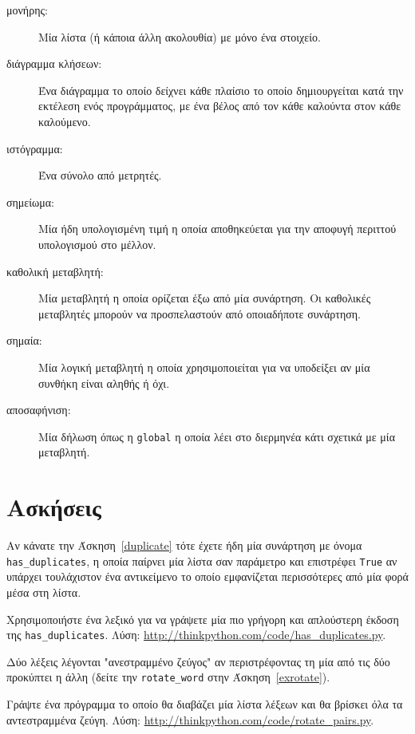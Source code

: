 \documentclass[10pt]{book}
\begin{document}
\begin{description}
\item[μονήρης:] Μία λίστα (ή κάποια άλλη ακολουθία) με μόνο ένα στοιχείο.

\item[διάγραμμα κλήσεων:] Ένα διάγραμμα το οποίο δείχνει κάθε πλαίσιο το οποίο δημιουργείται κατά την εκτέλεση ενός προγράμματος, με ένα βέλος από τον κάθε καλούντα στον κάθε καλούμενο.

\item[ιστόγραμμα:] Ένα σύνολο από μετρητές.

\item[σημείωμα:] Μία ήδη υπολογισμένη τιμή η οποία αποθηκεύεται για την αποφυγή περιττού υπολογισμού στο μέλλον.

\item[καθολική μεταβλητή:] Μία μεταβλητή η οποία ορίζεται έξω από μία συνάρτηση. Οι καθολικές μεταβλητές μπορούν να προσπελαστούν από οποιαδήποτε συνάρτηση.

\item[σημαία:] Μία λογική μεταβλητή η οποία χρησιμοποιείται για να υποδείξει αν μία συνθήκη είναι αληθής ή όχι.

\item[αποσαφήνιση:] Μία δήλωση όπως η {\tt global} η οποία λέει στο διερμηνέα κάτι σχετικά με μία μεταβλητή.

\end{description}

 
\section{Ασκήσεις}

\begin{exercise}

Αν κάνατε την Άσκηση~\ref{duplicate} τότε έχετε ήδη μία συνάρτηση με όνομα  \verb"has_duplicates", η οποία παίρνει μία λίστα σαν παράμετρο και επιστρέφει  {\tt True} αν υπάρχει τουλάχιστον ένα αντικείμενο το οποίο εμφανίζεται περισσότερες από μία φορά μέσα στη λίστα.

Χρησιμοποιήστε ένα λεξικό για να γράψετε μία πιο γρήγορη και απλούστερη έκδοση της \verb"has_duplicates". Λύση: \url{http://thinkpython.com/code/has_duplicates.py}.
\\
\end{exercise}


\begin{exercise}
\label{exrotatepairs}

Δύο λέξεις λέγονται "ανεστραμμένο ζεύγος" αν περιστρέφοντας τη μία από τις δύο προκύπτει η άλλη (δείτε την \verb"rotate_word" στην Άσκηση~\ref{exrotate}).

Γράψτε ένα πρόγραμμα το οποίο θα διαβάζει μία λίστα λέξεων και θα βρίσκει όλα τα αντεστραμμένα ζεύγη. Λύση: \url{http://thinkpython.com/code/rotate_pairs.py}.
\\
\end{exercise}
\end{document}
